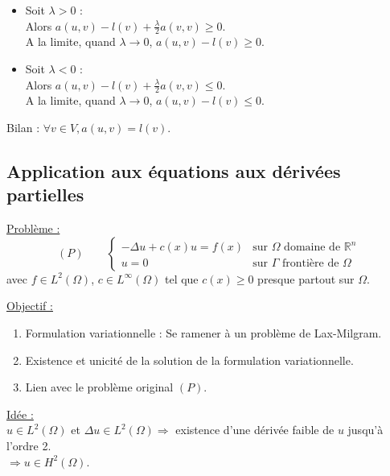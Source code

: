 \documentclass[12pt,a4paper]{article}
\newcommand{\important}[1]{%
    \begin{tcolorbox}[colback=red!10!white,colframe=red!30!black]
        #1
    \end{tcolorbox}
}
\begin{document}
{    \begin{itemize}
        \item Soit $\lambda > 0$ : \\
        Alors $a(u, v) - l(v) + \frac{\lambda}{2} a(v, v) \geq 0$. \\
        A la limite, quand $\lambda \rightarrow 0$, $a(u, v) - l(v) \geq 0$.

        \item Soit $\lambda < 0$ : \\
        Alors $a(u, v) - l(v) + \frac{\lambda}{2} a(v, v) \leq 0$. \\
        A la limite, quand $\lambda \rightarrow 0$, $a(u, v) - l(v) \leq 0$.
    \end{itemize}

    Bilan : $\forall v \in V, a(u, v) = l(v)$.
}


\subsection{Application aux équations aux dérivées partielles}

\important{
    \underline{Problème :}
    \begin{equation}
        (P) \qquad
        \begin{cases}
            -\Delta u + c(x)u = f(x) & \text{sur } \Omega \text{ domaine de } \mathbb{R}^n \\
            u = 0 & \text{sur } \Gamma \text{ frontière de } \Omega
        \end{cases}
    \end{equation}
    avec $f \in L^2(\Omega)$, $c \in L^{\infty}(\Omega)$ tel que $c(x) \geq 0$ presque partout sur $\Omega$.
}

\underline{Objectif :}
\begin{enumerate}
    \item Formulation variationnelle : Se ramener à un problème de Lax-Milgram.
    \item Existence et unicité de la solution de la formulation variationnelle.
    \item Lien avec le problème original $(P)$.
\end{enumerate}

\underline{Idée :} \\
$u \in L^2(\Omega)$ et $\Delta u \in L^2(\Omega) \Rightarrow$ existence d'une dérivée faible de $u$ jusqu'à l'ordre 2.\\
$\Rightarrow u \in H^2(\Omega)$. \\
\end{document}
